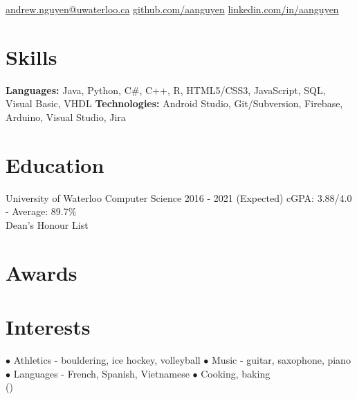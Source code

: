 \documentclass[]{aanguyen_res}
\begin{document}
	\begin{sidebar}%
		\vspace{35pt}%
			\iconentry{\faEnvelope}\href{mailto:andrew.nguyen@uwaterloo.ca}{andrew.nguyen@uwaterloo.ca}
			\iconentry{\faGithub}\href{http://github.com/aanguyen}{github.com/aanguyen}
			\iconentry{\faLinkedin}\href{http://www.linkedin.com/in/aanguyen}{linkedin.com/in/aanguyen}
			\vspace{0.75cm}%
		\section{Skills}
			\textbf{Languages: }Java, Python, C\#, C++, R, HTML5/CSS3, JavaScript, SQL, Visual Basic, VHDL
			\vspace{0.15cm}%
			\textbf{Technologies: }Android Studio, Git/Subversion, Firebase, Arduino, Visual Studio, Jira
			\vspace{1cm}%
		\section{Education}
			\eduentry%
				{University of Waterloo}%
				{Computer Science}%
				{2016 - 2021 (Expected)}%
				{cGPA: 3.88/4.0 - Average: 89.7\% \\Dean's Honour List}
			\vspace{0.65cm}%
		\section{Awards}
			\vspace{0.65cm}%
		\section{Interests}
		$\bullet$ Athletics - bouldering, ice hockey, volleyball
		$\bullet$ Music - guitar, saxophone, piano
		$\bullet$ Languages - French, Spanish, Vietnamese
		$\bullet$ Cooking, baking\\()
	\end{sidebar}%
\end{document}
